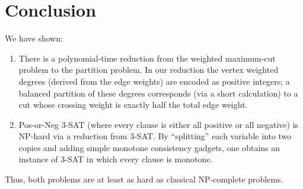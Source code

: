 \documentclass[letterpaper, 11pt]{article}
\newcommand{\1}{\mathds{1}}	%
\theoremstyle{definition}
\newenvironment{solution}{{\par\noindent\it Solution.}}{}
\begin{document}
\begin{solution}
\bigskip
\section*{Conclusion}

We have shown:
\begin{enumerate}
    \item There is a polynomial-time reduction from the weighted maximum-cut problem to the partition problem. In our reduction the vertex weighted degrees (derived from the edge weights) are encoded as positive integers; a balanced partition of these degrees corresponds (via a short calculation) to a cut whose crossing weight is exactly half the total edge weight.
    \item Pos-or-Neg 3-SAT (where every clause is either all positive or all negative) is NP-hard via a reduction from 3-SAT. By “splitting” each variable into two copies and adding simple monotone consistency gadgets, one obtains an instance of 3-SAT in which every clause is monotone.
\end{enumerate}
Thus, both problems are at least as hard as classical NP-complete problems.
\end{solution}
\clearpage
\end{document}
